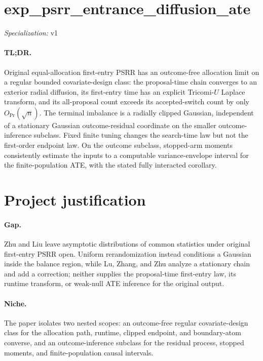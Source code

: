 \documentclass{article}
\begin{document}
\sloppy

\section*{exp\_\allowbreak{}psrr\_\allowbreak{}entrance\_\allowbreak{}diffusion\_\allowbreak{}ate}

\noindent\textit{Specialization:} v1\par

\paragraph{TL;DR.} Original equal-allocation first-entry PSRR has an outcome-free allocation limit on a regular bounded covariate-design class: the proposal-time chain converges to an exterior radial diffusion, its first-entry time has an explicit Tricomi-\(U\) Laplace transform, and its all-proposal count exceeds its accepted-switch count by only \(O_{\Pr}(\sqrt n)\). The terminal imbalance is a radially clipped Gaussian, independent of a stationary Gaussian outcome-residual coordinate on the smaller outcome-inference subclass. Fixed finite tuning changes the search-time law but not the first-order endpoint law. On the outcome subclass, stopped-arm moments consistently estimate the inputs to a computable variance-envelope interval for the finite-population ATE, with the stated fully interacted corollary.

\section{Project justification}

\paragraph{Gap.} Zhu and Liu leave asymptotic distributions of common statistics under original first-entry PSRR open. Uniform rerandomization instead conditions a Gaussian inside the balance region, while Lu, Zhang, and Zhu analyze a stationary chain and add a correction; neither supplies the proposal-time first-entry law, its runtime transform, or weak-null ATE inference for the original output.

\paragraph{Niche.} The paper isolates two nested scopes: an outcome-free regular covariate-design class for the allocation path, runtime, clipped endpoint, and boundary-atom converse, and an outcome-inference subclass for the residual process, stopped moments, and finite-population causal intervals.
\end{document}
